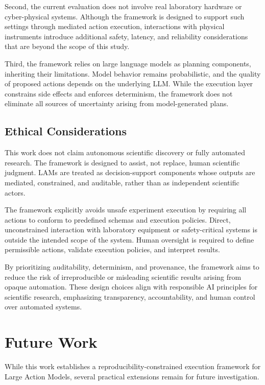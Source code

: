\documentclass[conference]{IEEEtran}
\begin{document}
Second, the current evaluation does not involve real laboratory hardware or cyber-physical systems. Although the framework is designed to support such settings through mediated action execution, interactions with physical instruments introduce additional safety, latency, and reliability considerations that are beyond the scope of this study.

Third, the framework relies on large language models as planning components, inheriting their limitations. Model behavior remains probabilistic, and the quality of proposed actions depends on the underlying LLM. While the execution layer constrains side effects and enforces determinism, the framework does not eliminate all sources of uncertainty arising from model-generated plans.

\subsection{Ethical Considerations}

This work does not claim autonomous scientific discovery or fully automated research. The framework is designed to assist, not replace, human scientific judgment. LAMs are treated as decision-support components whose outputs are mediated, constrained, and auditable, rather than as independent scientific actors.

The framework explicitly avoids unsafe experiment execution by requiring all actions to conform to predefined schemas and execution policies. Direct, unconstrained interaction with laboratory equipment or safety-critical systems is outside the intended scope of the system. Human oversight is required to define permissible actions, validate execution policies, and interpret results.

By prioritizing auditability, determinism, and provenance, the framework aims to reduce the risk of irreproducible or misleading scientific results arising from opaque automation. These design choices align with responsible AI principles for scientific research, emphasizing transparency, accountability, and human control over automated systems.
\section{Future Work}

While this work establishes a reproducibility-constrained execution framework for Large Action Models, several practical extensions remain for future investigation.
\end{document}
